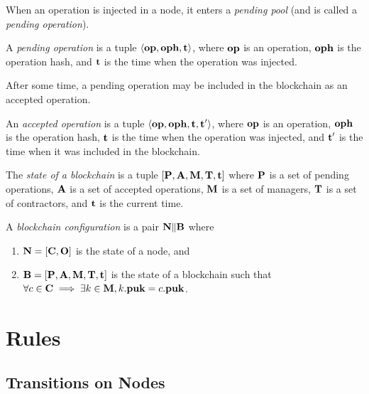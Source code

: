 \documentclass[a4paper]{llncs}
\begin{document}
When an operation is injected in a node, it enters a \emph{pending pool}
(and is called a \emph{pending operation}). 

 \begin{definition}%
A \emph{pending operation} is a tuple  $\langle  \textbf{op}, \textbf{oph}, \textbf{t}
\rangle $, where $\textbf{op}$ is an operation, $\textbf{oph}$ is the operation hash,
and $\textbf{t}$ is the time when the operation was injected. 
\end{definition}

After some time, a pending operation may be included in the blockchain as an accepted operation.

 \begin{definition}%
An \emph{accepted operation}  is a tuple $\langle  \textbf{op}, \textbf{oph}, \textbf{t}, \textbf{t}' \rangle
$, where $\textbf{op}$ is an operation, $\textbf{oph}$ is the operation hash, $\textbf{t}$ is the time when the operation was injected, and
$\textbf{t}'$ is the time when it was included in the blockchain. 
\end{definition}

\begin{definition}%
  The \emph{state of a blockchain} is a tuple
  $[\textbf{P}, \textbf{A}, \textbf{M}, \textbf{T}, \textbf{t}]$ where
  $\textbf{P}$ is a set of pending operations,  $\textbf{A}$ is a set
  of accepted operations, $\textbf{M}$ is a set of managers,
  $\textbf{T}$ is a set of contractors, and $\textbf{t}$ is the current time. 
\end{definition}

\begin{definition}%
A \emph{blockchain configuration} is a pair
$ \textbf{N} \| \textbf{B}$ where
\begin{enumerate}
\item $\textbf{N} = [\textbf{C}, \textbf{O}]$ is the state of a node, and
\item $\textbf{B} = [\textbf{P}, \textbf{A}, \textbf{M}, \textbf{T}, \textbf{t}]$ is the state of a blockchain 
  such that $\forall c \in \textbf{C} \implies \exists k\in \textbf{M}, k.\textbf{puk} = c.\textbf{puk}$.
\end{enumerate}
\end{definition}

\clearpage{}
\section{Rules}

\subsection{Transitions on Nodes}
\label{sec:transitions-nodes}
\end{document}
